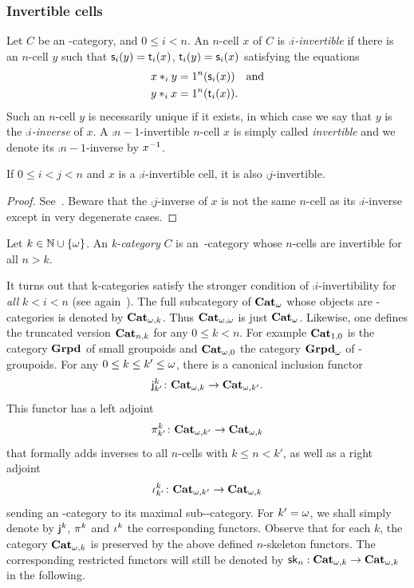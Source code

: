 \subsubsection{Invertible cells}\label{ssubsec:invert}
Let $C$ be an \oo-category, and $0\leq i <n$. An $n$-cell $x$ of $C$ is {\em $\comp i$-invertible} if there is an $n$-cell $y$ such that $\sce i(y)=\tge i(x)$, $\tge i(y)=\sce i(x)$ satisfying the equations 
  \begin{align*}
    x\comp i y & = \unit n(\sce i(x)) \quad \hbox{and}\\
    y\comp i x & =  \unit n(\tge i(x)).
  \end{align*}
  Such an $n$-cell $y$ is necessarily unique if it exists, in which case
  we say that $y$ is  the {\em $\comp i$-inverse} of $x$. A
  $\comp {n-1}$-invertible $n$-cell $x$ is simply called {\em
    invertible} and we denote its $\comp{n-1}$-inverse by $\inv x$. 
  \begin{proposition}\label{prop:invcell}
    If $0\leq i< j<n$ and $x$ is a $\comp i$-invertible cell, it is also $\comp j$-invertible.
  \end{proposition}
  \begin{proof}
    See~\cite[14.5]{abgmmm:polybk}. Beware that the $\comp j$-inverse
    of $x$ is not the same $n$-cell as its $\comp i$-inverse except in
    very degenerate cases. 
  \end{proof}
  \begin{definition}
    Let $k\in\N\cup\set{\oo}$. An {\em \ook k-category} $C$ is
    an~\oo-category whose $n$-cells are invertible for all $n>k$.
    \end{definition}
  \begin{paragr}\label{paragr:invert}
    It turns out that \ook k-categories satisfy the stronger
    condition of $\comp i$-invertibility for {\em all} $k<i<n$ (see
    again~\cite[14.5]{abgmmm:polybk}).  The full subcategory of
    $\oCat$ whose objects are -categories is denoted by $\opCat
    k$. Thus $\opCat{\oo}$ is just $\oCat$. Likewise, one defines the truncated version $\npCat nk$ for
    any $0\leq k<n$.  For example $\npCat 10$ is the category $\Grpd$
    of small groupoids and $\opCat 0$ the category $\oGrpd$ of
    \oo-groupoids. For any $0 \leq k \leq k'\leq \oo$, there is a canonical
    inclusion functor
    \[
      \emb{k}{k'} \colon \opCat{k} \to \opCat{k'}.
    \]
    This functor has a left adjoint
    \[
      \pifun{k}{k'} \colon \opCat{k'} \to \opCat{k}
    \]
    that formally adds inverses to all $n$-cells with $k \leq n < k'$,
    as well as a right adjoint 
    \[
      \maxgr{k}{k'}\colon\opCat{k'}\to \opCat{k}
    \]
    sending an \nbd-category to its maximal
    sub\nbd-\nbd-category. For $k'=\oo$, we shall simply denote
    by $\oemb k$, $\opifun k$ and $\omaxgr k$ the corresponding
    functors. Observe that for each $k$, the category $\opCat k$ is
    preserved by the above defined $n$-skeleton functors. The
    corresponding restricted functors will still be denoted by $\skl n:\opCat
    k\to\opCat k$ in the following.
 \end{paragr} 


